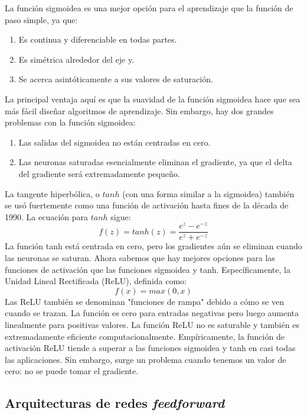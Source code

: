 \documentclass[a4paper,12pt]{article}
\begin{document}
La función sigmoidea es una mejor opción para el aprendizaje que la función de paso simple, ya que:
\begin{enumerate}[noitemsep, topsep=2pt]
\item Es continua y diferenciable en todas partes.
\item Es simétrica alrededor del eje y.
\item Se acerca asintóticamente a sus valores de saturación.
\end{enumerate}
La principal ventaja aquí es que la suavidad de la función sigmoidea hace que sea más fácil diseñar algoritmos de aprendizaje. Sin embargo, hay dos grandes problemas con la función sigmoidea:
\begin{enumerate}[noitemsep, topsep=2pt]
\item Las salidas del sigmoidea no están centradas en cero.
\item Las neuronas saturadas esencialmente eliminan el gradiente, ya que el delta del gradiente será extremadamente pequeño.
\end{enumerate}

La tangente hiperbólica, o $tanh$ (con una forma similar a la sigmoidea) también se usó fuertemente como una función de activación hasta fines de la década de 1990.
La ecuación para $tanh$ sigue:
\begin{equation}
f(z) = tanh(z) = \frac{e^z - e^{-z}}{e^z + e^{-z}}
\end{equation}
La función tanh está centrada en cero, pero los gradientes aún se eliminan cuando las neuronas se saturan.
Ahora sabemos que hay mejores opciones para las funciones de activación que las funciones sigmoidea y tanh. Específicamente, la Unidad Lineal Rectificada (ReLU), definida como:
\begin{equation}
f(x) = max(0, x)
\end{equation}
Las ReLU también se denominan "funciones de rampa" debido a cómo se ven cuando se trazan. La función es cero para entradas negativas pero luego aumenta linealmente para positivas valores. La función ReLU no es saturable y también es extremadamente  eficiente computacionalmente.
Empíricamente, la función de activación ReLU tiende a superar a las funciones sigmoidea y tanh en casi todas las aplicaciones. Sin embargo, surge un problema cuando tenemos un valor de cero: no se puede tomar el gradiente.

\subsection{Arquitecturas de redes \textit{feedforward}}
\end{document}
